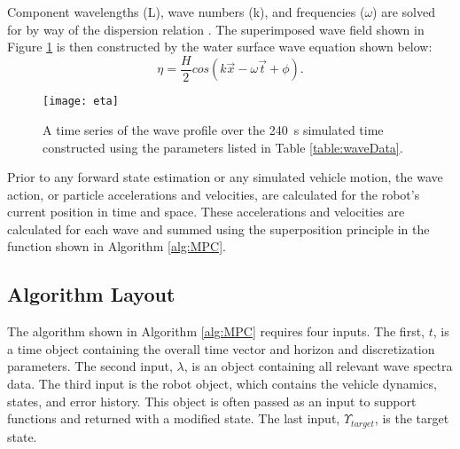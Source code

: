 \documentclass[letterpaper, 10 pt, conferences]{ieeeconf}  %
\begin{document}
Component wavelengths (L), wave numbers (k), and frequencies ($\omega$) are solved for by way of the dispersion relation \cite{D&D}. The superimposed wave field shown in Figure \ref{fig:eta} is then constructed by the water surface wave equation shown below:  
\begin{equation} 
\eta = \frac{H}{2}cos(k\vec{x}-\omega\vec{t}+\phi) .
\label{eqn9}
\end{equation}

\begin{figure}
\texttt{[image: eta]}
\vspace*{-14pt}
\centering
\caption{A time series of the wave profile over the 240~s simulated time constructed using the parameters listed in Table \ref{table:waveData}.}
\label{fig:eta}
\end{figure}

Prior to any forward state estimation or any simulated vehicle motion, the wave action, or particle accelerations and velocities, are calculated for the robot's current position in time and space. These accelerations and velocities are calculated for each wave and summed using the superposition principle in the function  shown in Algorithm \ref{alg:MPC}.

\subsection{Algorithm Layout}

The  algorithm shown in Algorithm \ref{alg:MPC} requires four inputs. The first, $t$, is a time object containing the overall time vector and horizon and discretization parameters. The second input, $\lambda$, is an object containing all relevant wave spectra data. The third input is the robot object, which contains the vehicle dynamics, states, and error history. This object is often passed as an input to support functions and returned with a modified state. The last input, $\Upsilon_{target}$, is the target state.
\end{document}
